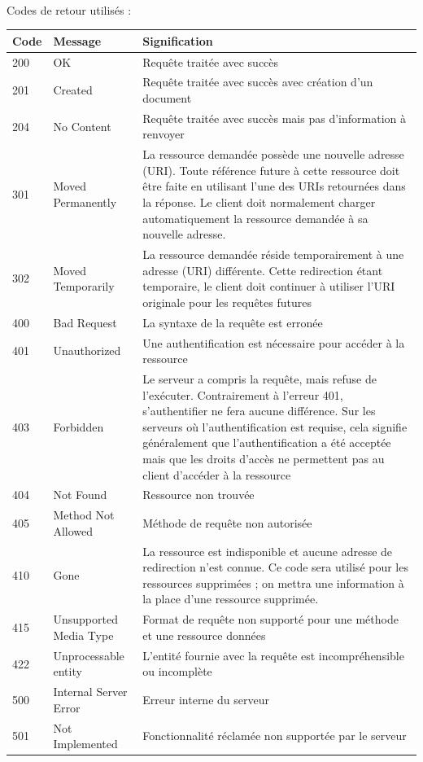 \documentclass{report}
\begin{document}
\paragraph{}
Codes de retour utilisés :

\begin{tabular}{|p{1cm}|p{4cm}|p{9cm}|}
\hline \bf Code & \bf Message & \bf Signification \\
\hline 200 & OK & Requête traitée avec succès \\
\hline 201 & Created & Requête traitée avec succès avec création d’un document \\
\hline 204 & No Content & Requête traitée avec succès mais pas d’information à renvoyer \\
\hline 301 & Moved Permanently & La ressource demandée possède une nouvelle adresse (URI). Toute référence future à cette ressource doit être faite en utilisant l'une des URIs retournées dans la réponse. Le client doit normalement charger 
automatiquement la ressource demandée à sa nouvelle adresse. \\
\hline 302 & Moved Temporarily & La ressource demandée réside temporairement à une adresse (URI) différente. Cette 
redirection étant temporaire, le client doit continuer à utiliser l'URI originale pour les requêtes futures \\
\hline 400 & Bad Request & La syntaxe de la requête est erronée \\
\hline 401 & Unauthorized & Une authentification est nécessaire pour accéder à la ressource \\
\hline 403 & Forbidden & Le serveur a compris la requête, mais refuse de l’exécuter. Contrairement à l’erreur 401, 
s’authentifier ne fera aucune différence. Sur les serveurs où l’authentification est requise, cela signifie généralement que 
l’authentification a été acceptée mais que les droits d’accès ne permettent pas au client d’accéder à la ressource \\
\hline 404 & Not Found & Ressource non trouvée \\
\hline 405 & Method Not Allowed & Méthode de requête non autorisée \\
\hline 410 & Gone & La ressource est indisponible et aucune adresse de redirection n’est connue. Ce code sera utilisé 
pour les ressources supprimées ; on mettra une information à la place d’une ressource supprimée. \\
\hline 415 & Unsupported Media Type & Format de requête non supporté pour une méthode et une ressource données \\
\hline 422 & Unprocessable entity & L’entité fournie avec la requête est incompréhensible ou incomplète \\
\hline 500 & Internal Server Error & Erreur interne du serveur \\
\hline 501 & Not Implemented & Fonctionnalité réclamée non supportée par le serveur \\
\hline
\end{tabular}
\end{document}
